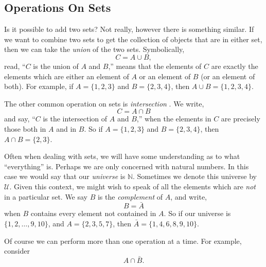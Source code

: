 \documentclass[10pt,]{book}
\theoremstyle{plain}
\theoremstyle{definition}
\theoremstyle{definition}
\theoremstyle{definition}
\numberwithin{equation}{section}
\def\N{\mathbb N}
\def\U{\mathcal U}
\begin{document}
\subsection[Operations On Sets]{Operations On Sets}\label{subsection-3}

      Is it possible to add two sets? Not really, however there is something similar. If we want to combine two sets to get the collection of objects that are in either set, then we can take the \emph{union}
       of the two sets. Symbolically,
      \begin{equation*}
        C = A \cup B,
      \end{equation*}
      read, ``\(C\) is the union of \(A\) and \(B\),'' means that the elements of \(C\) are exactly the elements which are either an element of \(A\) or an element of \(B\) (or an element of both). For example, if \(A = \{1, 2, 3\}\)      and \(B = \{2, 3, 4\}\), then \(A \cup B = \{1, 2, 3, 4\}\).
\par

      The other common operation on sets is \emph{intersection}
      . We write,
      \begin{equation*}
        C = A \cap B
      \end{equation*}
      and say, ``\(C\) is the intersection of \(A\) and \(B\),'' when the elements in \(C\) are precisely those both in \(A\) and in \(B\). So if \(A = \{1, 2, 3\}\) and \(B = \{2, 3, 4\}\), then \(A \cap B = \{2, 3\}\).
\par

      Often when dealing with sets, we will have some understanding as to what ``everything'' is. Perhaps we are only concerned with natural numbers. In this case we would say that our \emph{universe} is \(\N\). Sometimes we denote this universe
      by \(\U\). Given this context, we might wish to speak of all the elements which are \emph{not} in a particular set. We say \(B\) is the \emph{complement}
       of \(A\), and write,
      \begin{equation*}
        B = \bar A
      \end{equation*}
      when \(B\) contains every element not contained in \(A\). So if our universe is \(\{1, 2,\ldots, 9, 10\}\), and \(A = \{2, 3, 5, 7\}\), then \(\bar A = \{1, 4, 6, 8, 9,10\}\).
\par

      Of course we can perform more than one operation at a time. For example, consider
      \begin{equation*}
        A \cap \bar B.
      \end{equation*}
\par
\end{document}
